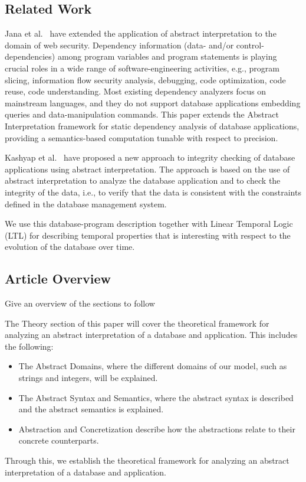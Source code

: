 \subsection{Related Work}\label{subsec:related-work}
Jana et al.~\cite{jana_extending_2020} have extended the application of abstract interpretation to the domain of web security.
Dependency information (data- and/or control-dependencies) among program variables and program statements is playing crucial roles in a wide range of software-engineering activities, e.g., program slicing, information flow security analysis, debugging, code optimization, code reuse, code understanding.
Most existing dependency analyzers focus on mainstream languages, and they do not support database applications embedding queries and data-manipulation commands.
This paper extends the Abstract Interpretation framework for static dependency analysis of database applications, providing a semantics-based computation tunable with respect to precision.

Kashyap et al.~\cite{kashyap_integrity_2022} have proposed a new approach to integrity checking of database applications using abstract interpretation.
The approach is based on the use of abstract interpretation to analyze the database application and to check the integrity of the data, i.e., to verify that the data is consistent with the constraints defined in the database management system.

We use this database-program description together with Linear Temporal Logic (LTL) for describing temporal properties that is interesting with respect to the evolution of the database over time.

\subsection{Article Overview}\label{subsec:article-overview}
Give an overview of the sections to follow


The Theory section of this paper will cover the theoretical framework for analyzing an abstract interpretation of a database and application.
This includes the following:

\begin{itemize}
    \item The Abstract Domains, where the different domains of our model, such as strings and integers, will be explained.
    \item The Abstract Syntax and Semantics, where the abstract syntax is described and the abstract semantics is explained.
    \item Abstraction and Concretization describe how the abstractions relate to their concrete counterparts.
\end{itemize}

Through this, we establish the theoretical framework for analyzing an abstract interpretation of a database and application.
